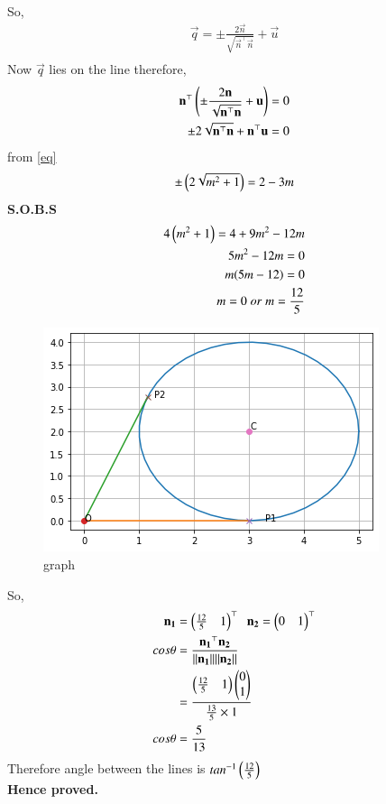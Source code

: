\documentclass[journal,12pt,twocolumn]{IEEEtran}
\begin{document}
So,
\begin{align}
    \vec{q}= \pm \frac{2 \vec{n}}{\sqrt{\vec{n}^{\top}\vec{n}}}+ \vec{u}\\
\end{align}
Now $\vec{q}$ lies on the line therefore,
\begin{align}
   \mathbf{n}^{\top} \left(\pm \frac{2 \mathbf{n}}{\sqrt{\mathbf{n}^{\top}\mathbf{n}}}+ \mathbf{u} \right) = 0\\
   \pm 2 \sqrt{\mathbf{n}^{\top}\mathbf{n}}+ \mathbf{n}^{\top}\mathbf{u}=0
\end{align}
from \eqref{eq}
\begin{align}
    \pm \left(2\sqrt{m^2+1}\right)=2-3m
\end{align}
\textbf{S.O.B.S}
\begin{align}
    4\left(m^2+1\right)=4 + 9m^2 -12m\\
    5m^2-12m=0\\
    m(5m-12)=0\\
    m=0 \;or\; m = \frac{12}{5}
\end{align}
    \begin{figure}
        \centering
        \includegraphics[width = \columnwidth]{Assignment_3.png}
        \caption{graph}
        \label{fig:my_label}
\end{figure}
So,
\begin{align}
\mathbf{n_1}&= \begin{pmatrix}\frac{12}{5} & 1\end{pmatrix}^{\top} \;\; \mathbf{n_2}=\begin{pmatrix}0 & 1\end{pmatrix}^{\top}\\
   cos \theta &= \frac{\mathbf{n_1}^{\top}\mathbf{n_2}}{\lVert\mathbf{n_1}\rVert\lVert\mathbf{n_2}\rVert}\\
   &= \frac{\begin{pmatrix}\frac{12}{5} & 1\end{pmatrix}\begin{pmatrix}0 \\ 1\end{pmatrix}}{\frac{13}{5}\times 1}\\
   cos \theta &= \frac{5}{13}
\end{align}
Therefore angle between the lines is $tan^{-1}\left(\frac{12}{5}\right)$ \\
\textbf{Hence proved.}
\end{document}
